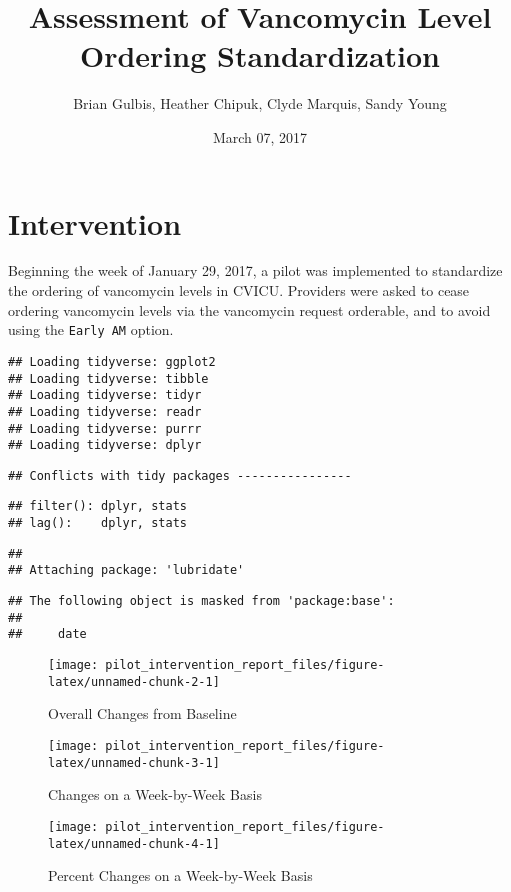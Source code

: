 \documentclass[]{tufte-handout}
\title{Assessment of Vancomycin Level Ordering Standardization}
\author{Brian Gulbis, Heather Chipuk, Clyde Marquis, Sandy Young}
\date{March 07, 2017}
\begin{document}
\maketitle




\section{Intervention}\label{intervention}

Beginning the week of January 29, 2017, a pilot was implemented to
standardize the ordering of vancomycin levels in CVICU. Providers were
asked to cease ordering vancomycin levels via the vancomycin request
orderable, and to avoid using the \texttt{Early\ AM} option.

\begin{verbatim}
## Loading tidyverse: ggplot2
## Loading tidyverse: tibble
## Loading tidyverse: tidyr
## Loading tidyverse: readr
## Loading tidyverse: purrr
## Loading tidyverse: dplyr
\end{verbatim}

\begin{verbatim}
## Conflicts with tidy packages ----------------
\end{verbatim}

\begin{verbatim}
## filter(): dplyr, stats
## lag():    dplyr, stats
\end{verbatim}

\begin{verbatim}
## 
## Attaching package: 'lubridate'
\end{verbatim}

\begin{verbatim}
## The following object is masked from 'package:base':
## 
##     date
\end{verbatim}

\begin{figure}
\texttt{[image: pilot\_intervention\_report\_files/figure-latex/unnamed-chunk-2-1]} \caption[Overall Changes from Baseline]{Overall Changes from Baseline}\label{fig:unnamed-chunk-2}
\end{figure}

\begin{figure}
\texttt{[image: pilot\_intervention\_report\_files/figure-latex/unnamed-chunk-3-1]} \caption[Changes on a Week-by-Week Basis]{Changes on a Week-by-Week Basis}\label{fig:unnamed-chunk-3}
\end{figure}

\begin{figure}
\texttt{[image: pilot\_intervention\_report\_files/figure-latex/unnamed-chunk-4-1]} \caption[Percent Changes on a Week-by-Week Basis]{Percent Changes on a Week-by-Week Basis}\label{fig:unnamed-chunk-4}
\end{figure}
\end{document}
